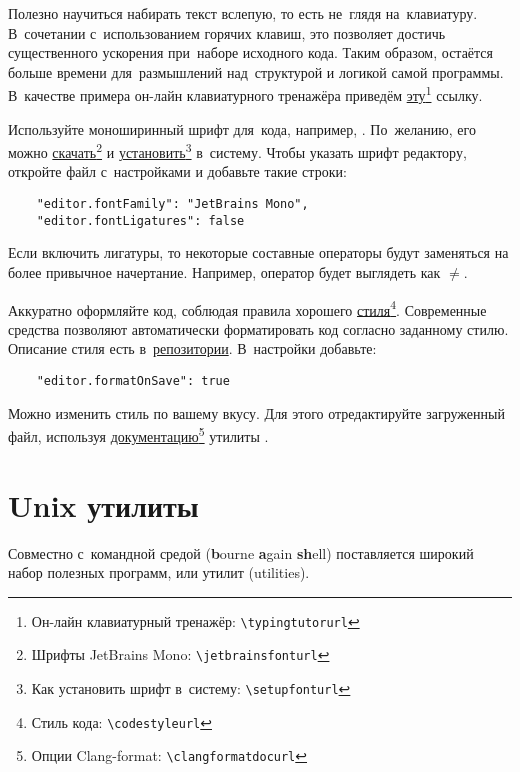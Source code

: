 Полезно научиться набирать текст вслепую, то есть не~глядя на~клавиатуру. В~сочетании с~использованием горячих клавиш, это позволяет достичь существенного ускорения при~наборе исходного кода. Таким образом, остаётся больше времени для~размышлений над~структурой и логикой самой программы. В~качестве примера он-лайн клавиатурного тренажёра приведём \href{\typingtutorurl}{эту}\footnote{Он-лайн клавиатурный тренажёр: \nolinkurl{\typingtutorurl}} ссылку.

Используйте моноширинный шрифт для~кода, например, . По~желанию, его можно \href{\jetbrainsfonturl}{скачать}\footnote{Шрифты JetBrains Mono: \nolinkurl{\jetbrainsfonturl}} и \href{\setupfonturl}{установить}\footnote{Как установить шрифт в~систему: \nolinkurl{\setupfonturl}} в~систему. Чтобы указать шрифт редактору, откройте файл с~настройками  и добавьте такие строки:
\begin{verbatim}
    "editor.fontFamily": "JetBrains Mono",
    "editor.fontLigatures": false
\end{verbatim}
\noindent Если включить лигатуры, то некоторые составные операторы будут заменяться на более привычное начертание. Например, оператор \code{!=} будет выглядеть как \(\neq\).

Аккуратно оформляйте код, соблюдая правила хорошего \href{\codestyleurl}{стиля}\footnote{Стиль кода: \nolinkurl{\codestyleurl}}. Современные средства позволяют автоматически форматировать код согласно заданному стилю. Описание стиля  есть в~\href{\courseselfurl}{репозитории}. В~настройки добавьте:

\begin{verbatim}
    "editor.formatOnSave": true
\end{verbatim}

Можно изменить стиль по вашему вкусу. Для этого отредактируйте загруженный файл, используя \href{\clangformatdocurl}{документацию}\footnote{Опции Clang-format: \nolinkurl{\clangformatdocurl}} утилиты .



\section{Unix утилиты}\label{sect:utils}
Совместно с~командной средой  (\textenglish{\textbf{b}ourne \textbf{a}gain \textbf{sh}ell}) поставляется широкий набор полезных программ, или утилит (\textenglish{utilities}).

